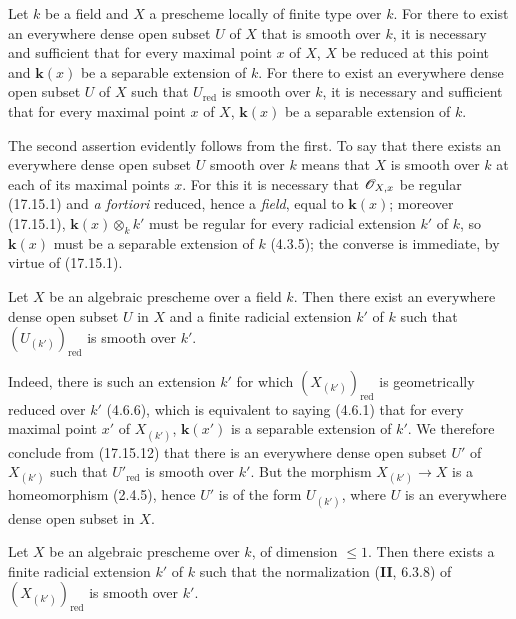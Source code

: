 \begin{proposition}[17.15.12]
\label{IV.17.15.12}
Let $k$ be a field and $X$ a prescheme locally of finite type over $k$. For there to exist an everywhere dense open subset $U$ of $X$ that is smooth over $k$, it is necessary and sufficient that for every maximal point $x$ of $X$, $X$ be reduced at this point and $\boldsymbol{k}(x)$ be a separable extension of $k$. For there to exist an everywhere dense open subset $U$ of $X$ such that $U_{\mathrm{red}}$ is smooth over $k$, it is necessary and sufficient that for every maximal point $x$ of $X$, $\boldsymbol{k}(x)$ be a separable extension of $k$.
\end{proposition}

The second assertion evidently follows from the first. To say that there exists an everywhere dense open subset $U$ smooth over $k$ means that $X$ is smooth over $k$ at each of its maximal points $x$. For this it is necessary that $\mathscr{O}_{X,x}$ be regular (17.15.1) and \emph{a fortiori} reduced, hence a \emph{field}, equal to $\boldsymbol{k}(x)$; moreover (17.15.1), $\boldsymbol{k}(x)\otimes_k k'$ must be regular for every radicial extension $k'$ of $k$, so $\boldsymbol{k}(x)$ must be a separable extension of $k$ (4.3.5); the converse is immediate, by virtue of (17.15.1).

\begin{corollary}[17.15.13]
\label{IV.17.15.13}
Let $X$ be an algebraic prescheme over a field $k$. Then there exist an everywhere dense open subset $U$ in $X$ and a finite radicial extension $k'$ of $k$ such that $(U_{(k')})_{\mathrm{red}}$ is smooth over $k'$.
\end{corollary}

Indeed, there is such an extension $k'$ for which $(X_{(k')})_{\mathrm{red}}$ is geometrically reduced over $k'$ (4.6.6), which is equivalent to saying (4.6.1) that for every maximal point $x'$ of $X_{(k')}$, $\boldsymbol{k}(x')$ is a separable extension of $k'$. We therefore conclude from (17.15.12) that there is an everywhere dense open subset $U'$ of $X_{(k')}$ such that $U'_{\mathrm{red}}$ is smooth over $k'$. But the morphism $X_{(k')}\to X$ is a homeomorphism (2.4.5), hence $U'$ is of the form $U_{(k')}$, where $U$ is an everywhere dense open subset in $X$.

\begin{proposition}[17.15.14]
\label{IV.17.15.14}
Let $X$ be an algebraic prescheme over $k$, of dimension $\leq1$. Then there exists a finite radicial extension $k'$ of $k$ such that the normalization \textup{(\textbf{II}, 6.3.8)} of $(X_{(k')})_{\mathrm{red}}$ is smooth over $k'$.
\end{proposition}

